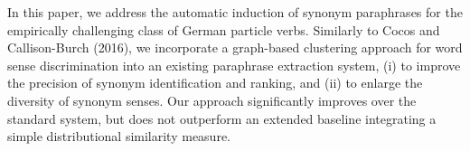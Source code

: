 In this paper, we address the automatic induction of synonym paraphrases for the empirically challenging class of German particle verbs. Similarly to Cocos and Callison-Burch (2016), we incorporate a graph-based clustering approach for word sense discrimination into an existing paraphrase extraction system, (i) to improve the precision of synonym identification and ranking, and (ii) to enlarge the diversity of synonym senses. Our approach significantly improves over the standard system, but does not outperform an extended baseline integrating a simple distributional similarity measure.

